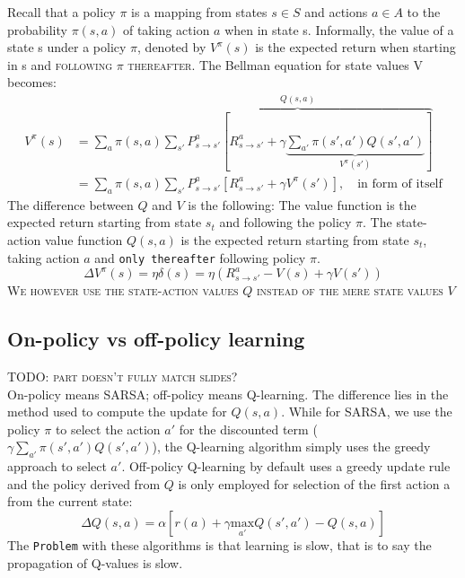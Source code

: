 \documentclass[11pt]{article}
\begin{document}
Recall that a policy $\pi$ is a mapping from states $s \in S$ and actions $a \in A$ to the probability $\pi(s,a)$ of taking action $a$ when in state s. Informally, the value of a state s under a
policy $\pi$, denoted by $V^\pi(s)$ is the expected return when starting in s and \textsc{following $\pi$ thereafter}. %
The Bellman equation for state values V becomes:
\begin{align*}
	V^{\pi}(s)&=\sum_a \pi(s,a) \overbrace{\sum_{s'} P^a_{s \rightarrow s'} [R^a_{s \rightarrow s'} + \gamma \underbrace{\sum_{a'}\pi(s',a')Q(s',a')}_{V^\pi(s')}]}^{Q(s,a)}\\
	&=\sum_a \pi(s,a) \sum_{s'} P_{s \rightarrow s'}^a[R_{s \rightarrow s'}^a + \gamma V^{\pi}(s')],\quad\text{in form of itself}
\end{align*}
The difference between $Q$ and $V$ is the following: The value function is the expected return starting from state $s_t$ and following the policy $\pi$. The state-action value function $Q(s,a)$ is the expected return starting from state $s_t$, taking action $a$ and \texttt{only thereafter} following policy $\pi$.
\[
	\Delta V^\pi(s)=\eta \delta(s)=\eta(R_{s \rightarrow s'}^a - V(s)+\gamma V(s'))
\]
\textsc{We however use the state-action values $Q$ instead of the mere state values $V$}

\subsection{On-policy vs off-policy learning}
\textsc{TODO: part doesn't fully match slides?}\\
On-policy means SARSA; off-policy means Q-learning. The difference lies in the method used to compute the update for $Q(s,a)$. While for SARSA, we use the policy $\pi$ to select the action $a'$ for the discounted term ($\gamma \sum_{a'} \pi(s',a')Q(s',a')$), the Q-learning algorithm simply uses the greedy approach to select $a'$. Off-policy Q-learning by default uses a greedy update rule and the policy derived from $Q$ is only employed for selection of the first action a from the current state:
\[
\Delta Q(s,a)=\alpha\left[r(a)+\gamma\underset{a'}{\text{max}} Q(s',a')-Q(s,a)\right]
\]
The \texttt{Problem} with these algorithms is that learning is slow, that is to say the propagation of Q-values is slow.
\end{document}
